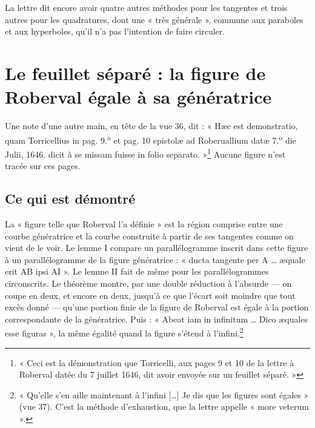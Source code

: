 \documentclass[11pt,a4paper]{article}
\begin{document}
La lettre dit encore avoir quatre autres méthodes pour les tangentes et trois
autres pour les quadratures, dont une « très générale », commune aux paraboles et
aux hyperboles, qu'il n'a pas l'intention de faire circuler.

\section*{Le feuillet séparé : la figure de Roberval égale à sa génératrice}

Une note d'une autre main, en tête de la vue 36, dit : « Hæc est demonstratio,
quam Torricellius in pag. 9.\textsuperscript{a} et pag. 10 epistolæ ad
Roberuallium datæ 7.\textsuperscript{o} die Julii, 1646. dicit à se missam fuisse
in folio separato. »\footnote{« Ceci est la démonstration que Torricelli, aux
pages 9 et 10 de la lettre à Roberval datée du 7 juillet 1646, dit avoir envoyée
sur un feuillet séparé. »} Aucune figure n'est tracée sur ces pages.

\subsection*{Ce qui est démontré}

La « figure telle que Roberval l'a définie » est la région comprise entre une
courbe génératrice et la courbe construite à partir de ses tangentes comme on
vient de le voir. Le lemme I compare un parallélogramme inscrit dans cette figure
à un parallélogramme de la figure génératrice : « ducta tangente per A \ldots{}
æquale erit AB ipsi AI ». Le lemme II fait de même pour les parallélogrammes
circonscrits. Le théorème montre, par une double réduction à l'absurde — on
coupe en deux, et encore en deux, jusqu'à ce que l'écart soit moindre que tout
excès donné — qu'une portion finie de la figure de Roberval est égale à la
portion correspondante de la génératrice. Puis : « Abeat iam in infinitum \ldots{}
Dico æquales esse figuras », la même égalité quand la figure s'étend à
l'infini.\footnote{« Qu'elle s'en aille maintenant à l'infini [\ldots] Je dis que
les figures sont égales » (vue 37). C'est la méthode d'exhaustion, que la lettre
appelle « more veterum ».}
\end{document}
